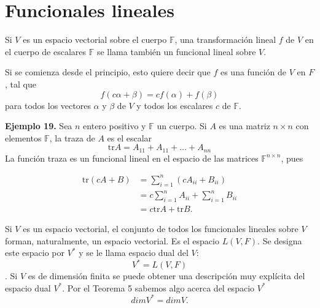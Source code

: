 \newpage

\section{{\Large Funcionales lineales}}
Si $V$ es un espacio vectorial sobre el cuerpo $\mathbb{F}$, una
transformación lineal $f$ de $V$ en el cuerpo de escalares
$\mathbb{F}$ se llama también un funcional lineal sobre $V$.

Si se comienza desde el principio, esto quiere decir que $f$ es
una función de $V$ en $F$, tal que
$$f(c\alpha + \beta) = cf(\alpha) +f(\beta)$$
para todos los vectores $\alpha$ y $\beta$ de $V$ y todos
los escalares $c$ de $\mathbb{F}$.

\textbf{Ejemplo 19.} Sea $n$ entero positivo y $\mathbb{F}$ un
cuerpo. Si $A$ es una matriz $n \times n$ con elementos
$\mathbb{F}$, la traza de $A$ es el escalar
$$\mathrm{tr} A = A_{11}+A_{11}+\dots+A_{nn}$$
La función traza es un funcional lineal en el espacio de las 
matrices $\mathbb{F}^{n\times n}$, pues

\begin{align*}
    \mathrm{tr} (cA + B) &= \sum_{i=1}^{n}(cA_{ii} + B_{ii})              \\
                &= c\sum_{i=1}^{n} A_{ii} + \sum_{i=1}^{n} B_{ii}\\
                &= c\mathrm{tr}A + \mathrm{tr}B.
\end{align*}

Si $V$ es un espacio vectorial, el conjunto de todos los funcionales lineales
sobre $V$ forman, naturalmente, un espacio vectorial. Es el espacio $L(V, F)$.
Se designa este espacio por $V^\ast$ y se le llama espacio dual del $V$:
$$V^\ast = L(V, F)$$.
Si $V$ es de dimensión ﬁnita se puede obtener una descripción
muy explícita del espacio dual $V^\ast$. Por el Teorema 5 sabemos
algo acerca del espacio $V^\ast$
$$dim V^\ast = dim V.$$